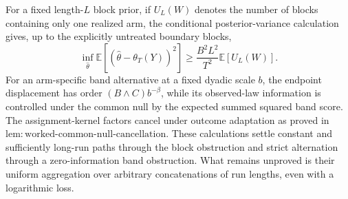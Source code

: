 For a fixed length-\(L\) block prior, if \(U_L(W)\) denotes the number of blocks containing only one realized arm, the conditional posterior-variance calculation gives, up to the explicitly untreated boundary blocks,
\[
 \inf_{\widehat\theta}
 \mathbb E\left[(\widehat\theta-\theta_T(Y))^2\right]
 \ge \frac{B^2L^2}{T^2}\mathbb E[U_L(W)].
\]
For an arm-specific band alternative at a fixed dyadic scale \(b\), the endpoint displacement has order \((B\wedge C)b^{-\beta}\), while its observed-law information is controlled under the common null by the expected summed squared band score.  The assignment-kernel factors cancel under outcome adaptation as proved in \(\mathrm{lem{:}worked\mbox{-}common\mbox{-}null\mbox{-}cancellation}\).  These calculations settle constant and sufficiently long-run paths through the block obstruction and strict alternation through a zero-information band obstruction.  What remains unproved is their uniform aggregation over arbitrary concatenations of run lengths, even with a logarithmic loss.
